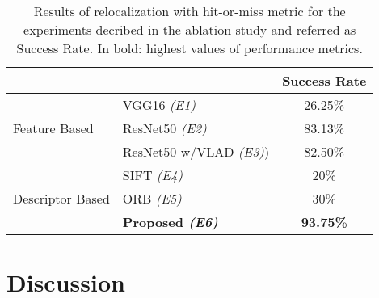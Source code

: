 \documentclass[sn-basic]{sn-jnl}%
\begin{document}
\begin{table}
\centering
\caption[Results of Recovery with hit-or-miss metric for the experiments decribed in the ablation study]{Results of relocalization with hit-or-miss metric for the experiments decribed in the ablation study and referred as Success Rate. In bold: highest values of performance metrics.}
\label{tab:results_relocalize_hm}
\begin{tabular}{llc}
                                       &                                             & \multicolumn{1}{l}{\textbf{Success Rate}} \\ \hline
\multicolumn{1}{|l|}{}                 & \multicolumn{1}{l|}{VGG16 \textit{(E1)}}               & \multicolumn{1}{c|}{26.25\%}                     \\ \cline{2-3} 
\multicolumn{1}{|l|}{Feature Based}    & \multicolumn{1}{l|}{ResNet50 \textit{(E2)}}            & \multicolumn{1}{c|}{83.13\%}                    \\ \cline{2-3} 
\multicolumn{1}{|l|}{}                 & \multicolumn{1}{l|}{ResNet50 w/VLAD \textit{(E3)})}     & \multicolumn{1}{c|}{82.50\%}                    \\ \hline
\multicolumn{1}{|l|}{}                 & \multicolumn{1}{l|}{SIFT \textit{(E4)}}              & \multicolumn{1}{c|}{20\%}                    \\ \cline{2-3} 
\multicolumn{1}{|l|}{Descriptor Based} & \multicolumn{1}{l|}{ORB \textit{(E5)}}               & \multicolumn{1}{c|}{30\%}                    \\ \cline{2-3} 
\multicolumn{1}{|l|}{}                 & \multicolumn{1}{l|}{\textbf{Proposed \textit{(E6)}}} & \multicolumn{1}{c|}{\textbf{93.75\%}}           \\ \hline
\end{tabular}
\end{table}

\section{Discussion}\label{sec:disc}
\end{document}
